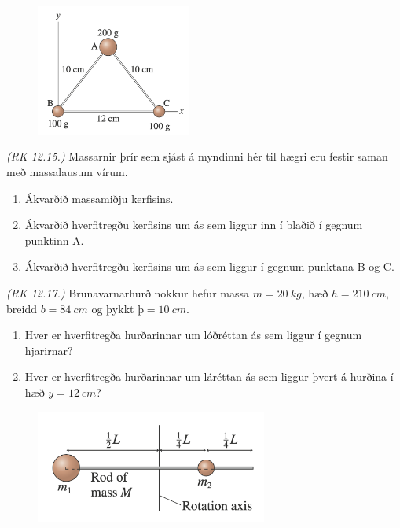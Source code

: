 \ifdefined \wholebook \else\documentclass[oneside]{book}\usepackage{EdlBook}\graphicspath{{figures/}}
\begin{document}
\begin{enumerate}[label = \textbf{Dæmi \thechapter.\arabic*.}]
\begin{minipage}{\linewidth}

\begin{figure}
\vspace{-1cm}
\includegraphics[width=2in]{images/inertiarot2.png}
\end{figure}

\item \textit{(RK 12.15.)} Massarnir þrír sem sjást á myndinni hér til hægri eru festir saman með massalausum vírum.

\begin{enumerate}[label = \textbf{(\alph*)}]
    \item Ákvarðið massamiðju kerfisins.
    \item Ákvarðið hverfitregðu kerfisins um ás sem liggur inn í blaðið í gegnum punktinn A.
    \item Ákvarðið hverfitregðu kerfisins um ás sem liggur í gegnum punktana B og C.
\end{enumerate}

\end{minipage}

\item \textit{(RK 12.17.)} Brunavarnarhurð nokkur hefur massa $m = \SI{20}{kg}$, hæð $h = \SI{210}{cm}$, breidd $b = \SI{84}{cm}$ og þykkt $þ = \SI{10}{cm}$.
\begin{enumerate}[label = \textbf{(\alph*)}]
    \item Hver er hverfitregða hurðarinnar um lóðréttan ás sem liggur í gegnum hjarirnar?
    \item Hver er hverfitregða hurðarinnar um láréttan ás sem liggur þvert á hurðina í hæð $y = \SI{12}{cm}$?
\end{enumerate}


\begin{minipage}{\linewidth}

\begin{figure}
\vspace{-0.75cm}
\includegraphics[width=3in]{images/gone.png}
\end{figure}


\end{minipage}
\end{enumerate}
\end{document}
